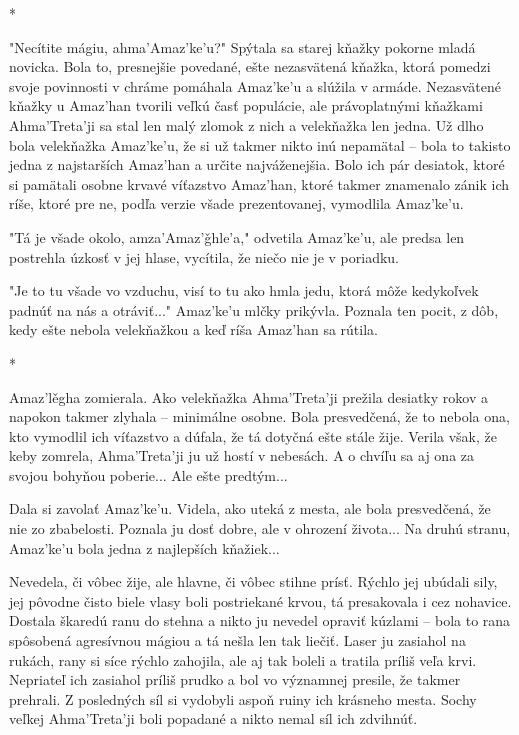 \documentclass{book}
\begin{document}
\begin{center}
*
\end{center}

"$ $Necítite mágiu, ahma'Amaz'ke'u?"$ $ Spýtala sa starej kňažky pokorne mladá novicka. Bola to, presnejšie povedané, ešte nezasvätená kňažka, ktorá pomedzi svoje povinnosti v chráme pomáhala Amaz'ke'u a slúžila v armáde. Nezasvätené kňažky u Amaz'han tvorili veľkú časť populácie, ale právoplatnými kňažkami Ahma'Treta'ji sa stal len malý zlomok z nich a velekňažka len jedna. Už dlho bola velekňažka Amaz'ke'u, že si už takmer nikto inú nepamätal – bola to takisto jedna z najstarších Amaz'han a určite najváženejšia. Bolo ich pár desiatok, ktoré si pamätali osobne krvavé víťazstvo Amaz'han, ktoré takmer znamenalo zánik ich ríše, ktoré pre ne, podľa verzie všade prezentovanej, vymodlila Amaz'ke'u.

"$ $Tá je všade okolo, amza'Amaz'g\v{}hle'a,"$ $ odvetila Amaz'ke'u, ale predsa len postrehla úzkosť v jej hlase, vycítila, že niečo nie je v poriadku.

"$ $Je to tu všade vo vzduchu, visí to tu ako hmla jedu, ktorá môže kedykoľvek padnúť na nás a otráviť..."$ $ Amaz'ke'u mlčky prikývla. Poznala ten pocit, z dôb, kedy ešte nebola velekňažkou a keď ríša Amaz'han sa rútila.

\begin{center}
*
\end{center}

Amaz'le\v{}gha zomierala. Ako velekňažka Ahma'Treta'ji prežila desiatky rokov a napokon takmer zlyhala – minimálne osobne. Bola presvedčená, že to nebola ona, kto vymodlil ich víťazstvo a dúfala, že tá dotyčná ešte stále žije. Verila však, že keby zomrela, Ahma'Treta'ji ju už hostí v nebesách. A o chvíľu sa aj ona za svojou bohyňou poberie... Ale ešte predtým...

Dala si zavolať Amaz'ke'u. Videla, ako uteká z mesta, ale bola presvedčená, že nie zo zbabelosti. Poznala ju dosť dobre, ale v ohrození života... Na druhú stranu, Amaz'ke'u bola jedna z najlepších kňažiek...

Nevedela, či vôbec žije, ale hlavne, či vôbec stihne prísť. Rýchlo jej ubúdali sily, jej pôvodne čisto biele vlasy boli postriekané krvou, tá presakovala i cez nohavice. Dostala škaredú ranu do stehna a nikto ju nevedel opraviť kúzlami – bola to rana spôsobená agresívnou mágiou a tá nešla len tak liečiť. Laser ju zasiahol na rukách, rany si síce rýchlo zahojila, ale aj tak boleli a tratila príliš veľa krvi. Nepriateľ ich zasiahol príliš prudko a bol vo významnej presile, že takmer prehrali. Z posledných síl si vydobyli aspoň ruiny ich krásneho mesta. Sochy veľkej Ahma'Treta'ji boli popadané a nikto nemal síl ich zdvihnúť.
\end{document}
